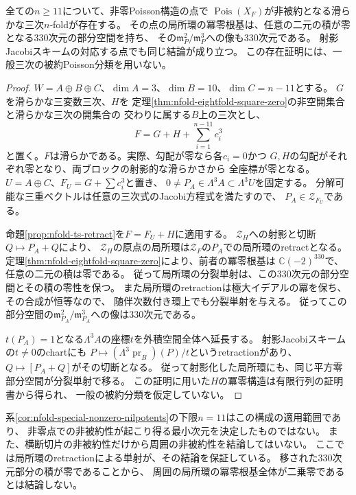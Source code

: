 \begin{corollary}[非零Poisson点に平方零構造を持つ滑らかな三次]
\label{cor:nfold-special-nonzero-nilpotents}
全ての$n\ge11$について、非零Poisson構造の点で
$\operatorname{Pois}(X_F)$が非被約となる滑らかな三次$n$-foldが存在する。
その点の局所環の冪零根基は、任意の二元の積が零となる330次元の部分空間を持ち、
その$\mathfrak m_P^2/\mathfrak m_P^3$への像も330次元である。
射影Jacobiスキームの対応する点でも同じ結論が成り立つ。
この存在証明には、一般三次の被約Poisson分類を用いない。
\end{corollary}
\begin{proof}
$W=A\oplus B\oplus C$、$\dim A=3$、$\dim B=10$、$\dim C=n-11$とする。
$G$を滑らかな三変数三次、$H$を
定理\ref{thm:nfold-eightfold-square-zero}の非空開集合と滑らかな三次の開集合の
交わりに属する$B$上の三次とし、
\[
 F=G+H+\sum_{i=1}^{n-11}c_i^3
\]
と置く。$F$は滑らかである。実際、勾配が零なら各$c_i=0$かつ
$G,H$の勾配がそれぞれ零となり、両ブロックの射影的な滑らかさから
全座標が零となる。
$U=A\oplus C$、$F_U=G+\sum c_i^3$と置き、
$0\ne P_A\in\Lambda^3A\subset\Lambda^3U$を固定する。
分解可能な三重ベクトルは任意の三次式のJacobi方程式を満たすので、
$P_A\in\mathcal Z_{F_U}$である。

命題\ref{prop:nfold-ts-retract}を$F=F_U+H$に適用する。
$\mathcal Z_H$への射影と切断$Q\mapsto P_A+Q$により、
$\mathcal Z_H$の原点の局所環は$\mathcal Z_F$の$P_A$での局所環のretractとなる。
定理\ref{thm:nfold-eightfold-square-zero}により、前者の冪零根基は
$\mathbb C(-2)^{330}$で、任意の二元の積は零である。
従って局所環の分裂単射は、この330次元の部分空間とその積の零性を保つ。
また局所環のretractionは極大イデアルの冪を保ち、その合成が恒等なので、
随伴次数付き環上でも分裂単射を与える。
従ってこの部分空間の$\mathfrak m_{P_A}^2/\mathfrak m_{P_A}^3$への像は330次元である。

$t(P_A)=1$となる$\Lambda^3A$の座標$t$を外積空間全体へ延長する。
射影Jacobiスキームの$t\ne0$のchartにも
$P\mapsto(\Lambda^3\operatorname{pr}_B)(P)/t$というretractionがあり、
$Q\mapsto[P_A+Q]$がその切断となる。
従って射影化した局所環にも、同じ平方零部分空間が分裂単射で移る。
この証明に用いた$H$の冪零構造は有限行列の証明書から得られ、
一般の被約分類を仮定していない。
\end{proof}

\begin{remark}
系\ref{cor:nfold-special-nonzero-nilpotents}の下限$n=11$はこの構成の適用範囲であり、
非零点での非被約性が起こり得る最小次元を決定したものではない。
また、横断切片の非被約性だけから周囲の非被約性を結論してはいない。
ここでは局所環のretractionによる単射が、その結論を保証している。
移された330次元部分の積が零であることから、
周囲の局所環の冪零根基全体が二乗零であるとは結論しない。
\end{remark}

